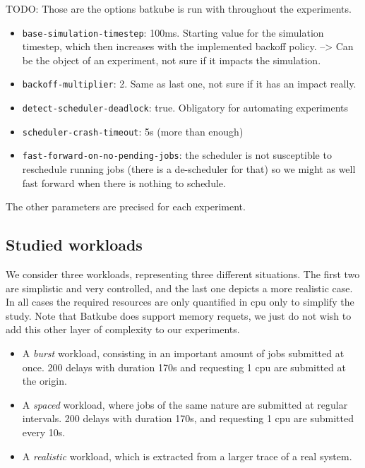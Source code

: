 \documentclass[12pt, a4paper]{memoir}
\begin{document}
TODO: Those are the options batkube is run with throughout the experiments.
\begin{itemize}
	\item \texttt{base-simulation-timestep}: 100ms. Starting value for the
		simulation timestep, which then increases with the implemented
		backoff policy. --> Can be the object of an experiment, not
		sure if it impacts the simulation.
	\item \texttt{backoff-multiplier}: 2. Same as last one, not sure if it
		has an impact really.
	\item \texttt{detect-scheduler-deadlock}: true. Obligatory for
		automating experiments
	\item \texttt{scheduler-crash-timeout}: 5s (more than enough)
	\item \texttt{fast-forward-on-no-pending-jobs}: the scheduler is not
		susceptible to reschedule running jobs (there is a de-scheduler
		for that) so we might as well fast forward when there is
		nothing to schedule.
\end{itemize}

The other parameters are precised for each experiment.

\subsection{Studied workloads}

We consider three workloads, representing three different situations. The first
two are simplistic and very controlled, and the last one depicts a more
realistic case. In all cases the required resources are only quantified in cpu
only to simplify the study. Note that Batkube does support memory requets, we
just do not wish to add this other layer of complexity to our experiments.

\begin{itemize}
	\item A \textit{burst} workload, consisting in an important amount of
		jobs submitted at once.  200 delays with duration 170s and
		requesting 1 cpu are submitted at the origin.
	\item A \textit{spaced} workload, where jobs of the same nature are
		submitted at regular intervals.  200 delays with duration 170s,
		and requesting 1 cpu are submitted every 10s.
	\item A \textit{realistic} workload, which is extracted from a larger
		trace of a real system.
\end{itemize}
\end{document}
